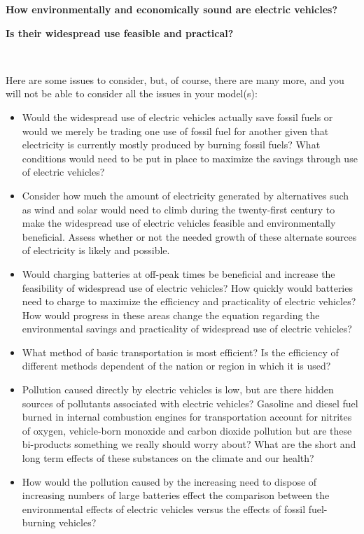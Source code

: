 \documentclass[bwprint]{cumcmthesis}
\begin{document}
\begin{shaded}
{
\renewcommand{\baselinestretch}{1.0}

\noindent\textbf{How environmentally and economically sound are electric vehicles?}

\noindent\textbf{Is their widespread use feasible and practical?}

\small\ 

\noindent Here are some issues to consider, but, of course, there are many more, and you will not be able to consider all the issues in your model(s):

\begin{itemize}
\item Would the widespread use of electric vehicles actually save fossil fuels or would we merely be trading one use of fossil fuel for another given that electricity is currently mostly produced by burning fossil fuels? What conditions would need to be put in place to maximize the savings through use of electric vehicles?
\item Consider how much the amount of electricity generated by alternatives such as wind and solar would need to climb during the twenty-first century to make the widespread use of electric vehicles feasible and environmentally beneficial. Assess whether or not the needed growth of these alternate sources of electricity is likely and possible.
\item Would charging batteries at off-peak times be beneficial and increase the feasibility of widespread use of electric vehicles? How quickly would batteries need to charge to maximize the efficiency and practicality of electric vehicles? How would progress in these areas change the equation regarding the environmental savings and practicality of widespread use of electric vehicles?
\item What method of basic transportation is most efficient? Is the efficiency of different methods dependent of the nation or region in which it is used?
\item Pollution caused directly by electric vehicles is low, but are there hidden sources of pollutants associated with electric vehicles? Gasoline and diesel fuel burned in internal combustion engines for transportation account for nitrites of oxygen, vehicle-born monoxide and carbon dioxide pollution but are these bi-products something we really should worry about? What are the short and long term effects of these substances on the climate and our health?
\item How would the pollution caused by the increasing need to dispose of increasing numbers of large batteries effect the comparison between the environmental effects of electric vehicles versus the effects of fossil fuel-burning vehicles?

\end{itemize}}
\end{shaded}
\end{document}
